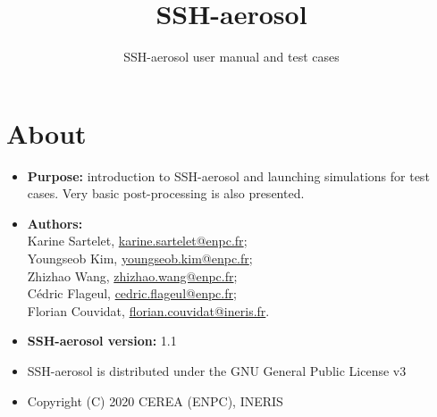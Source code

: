 \documentclass[a4paper,11pt]{article}
\title{SSH-aerosol}
\date{}
\author{SSH-aerosol user manual and test cases}
\begin{document}
\maketitle

\section*{About}

\begin{itemize}
\item[] {\bf Purpose:} introduction to SSH-aerosol and launching simulations
  for test cases. Very basic post-processing is also
  presented. 
\item[] {\bf Authors:} \\Karine Sartelet, \url{karine.sartelet@enpc.fr};\\
  Youngseob Kim, \url{youngseob.kim@enpc.fr};\\ Zhizhao Wang,
  \url{zhizhao.wang@enpc.fr};\\ C\'edric Flageul,
  \url{cedric.flageul@enpc.fr}; \\Florian Couvidat, \url{florian.couvidat@ineris.fr}.
\item[] {\bf SSH-aerosol version:} 1.1
\item[] SSH-aerosol is distributed under the GNU General Public License v3
\item[] Copyright (C) 2020 CEREA (ENPC), INERIS
\end{itemize}

\tableofcontents

\newpage
\end{document}
